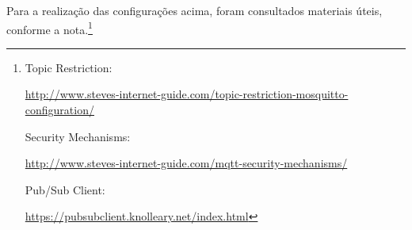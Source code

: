 Para a realização das configurações acima, foram consultados materiais úteis, conforme a nota.\footnote{Topic Restriction:

\url{http://www.steves-internet-guide.com/topic-restriction-mosquitto-configuration/}

Security Mechanisms:

\url{http://www.steves-internet-guide.com/mqtt-security-mechanisms/}

Pub/Sub Client:

\url{https://pubsubclient.knolleary.net/index.html} }
